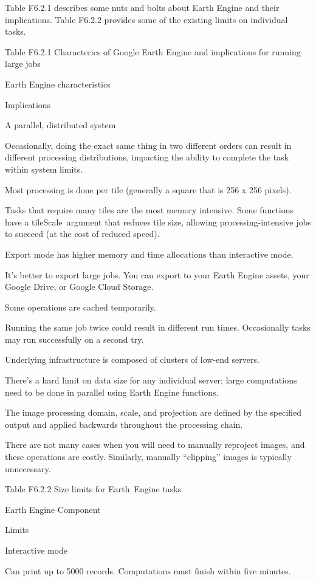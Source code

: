\documentclass[
  letterpaper,
  DIV=11,
  numbers=noendperiod]{scrreprt}
\begin{document}
Table F6.2.1 describes some nuts and bolts about Earth Engine and their
implications. Table F6.2.2 provides some of the existing limits on
individual tasks.

Table F6.2.1 Characterics of Google Earth Engine and implications for
running large jobs~

Earth Engine characteristics

Implications

A parallel, distributed system

Occasionally, doing the exact same thing in two different orders can
result in different processing distributions, impacting the ability to
complete the task within system limits.

Most processing is done per tile (generally a square that is 256 x 256
pixels).

Tasks that require many tiles are the most memory intensive. Some
functions have a tileScale~argument that reduces tile size, allowing
processing-intensive jobs to succeed (at the cost of reduced speed).

Export mode has higher memory and time allocations than interactive
mode.

It's better to export large jobs. You can export to your Earth Engine
assets, your Google Drive, or Google Cloud Storage.

Some operations are cached temporarily.

Running the same job twice could result in different run times.
Occasionally tasks may run successfully on a second try.

Underlying infrastructure is composed of clusters of low-end servers.

There's a hard limit on data size for any individual server; large
computations need to be done in parallel using Earth Engine functions.

The image processing domain, scale, and projection are defined by the
specified output and applied backwards throughout the processing chain.

There are not many cases when you will need to manually reproject
images, and these operations are costly. Similarly, manually
``clipping'' images is typically unnecessary.

Table F6.2.2 Size limits for Earth~Engine tasks

Earth Engine Component

Limits

Interactive mode

Can print up to 5000 records. Computations must finish within five
minutes.
\end{document}
